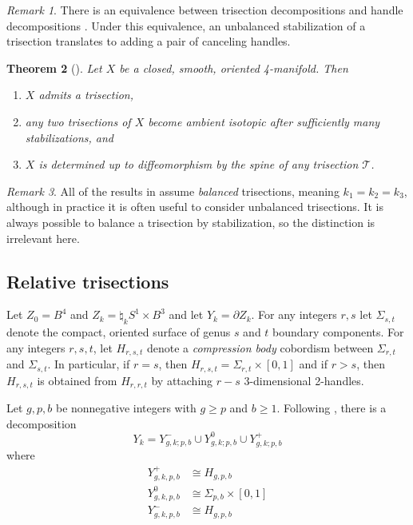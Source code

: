 \documentclass[11pt]{amsart}
\newtheorem{theorem}{Theorem}[section]
\theoremstyle{definition}
\theoremstyle{remark}
\newtheorem{remark}[theorem]{Remark}
\numberwithin{equation}{section}
\newcommand{\cT}{\mathcal{T}}
\newcommand{\del}{\partial}
\begin{document}
\begin{remark}
There is an equivalence between trisection decompositions and handle decompositions \cite[Section 4]{Gay-Kirby}.  Under this equivalence, an unbalanced stabilization of a trisection translates to adding a pair of canceling handles.
\end{remark}

\begin{theorem}[\cite{Gay-Kirby}] Let $X$ be a closed, smooth, oriented 4-manifold.  Then
\begin{enumerate}
\item $X$ admits a trisection,
\item any two trisections of $X$ become ambient isotopic after sufficiently many stabilizations, and
\item $X$ is determined up to diffeomorphism by the spine of any trisection $\cT$.
\end{enumerate}
\end{theorem}

\begin{remark}
All of the results in \cite{Gay-Kirby} assume {\it balanced} trisections, meaning $k_1 = k_2 = k_3$, although in practice it is often useful to consider unbalanced trisections.  It is always possible to balance a trisection by stabilization, so the distinction is irrelevant here.
\end{remark}


\subsection{Relative trisections}

Let $Z_0 = B^4$ and $Z_k = \natural_k S^1 \times B^3$ and let $Y_k = \del Z_k$.  For any integers $r,s$ let $\Sigma_{s,t}$ denote the compact, oriented surface of genus $s$ and $t$ boundary components.  For any integers $r,s,t$, let $H_{r,s,t}$ denote a {\it compression body} cobordism between $\Sigma_{r,t}$ and $\Sigma_{s,t}$.  In particular, if $r = s$, then $H_{r,s,t} = \Sigma_{r,t} \times [0,1]$ and if $r > s$, then $H_{r,s,t}$ is obtained from $H_{r,r,t}$ by attaching $r - s$ 3-dimensional 2-handles.  

Let $g,p,b$ be nonnegative integers with $g \geq p$ and $b \geq 1$.  Following \cite{Gay-Kirby,Relative-Tri}, there is a decomposition
\[Y_k = Y^-_{g,k;p,b} \cup Y^0_{g,k;p,b} \cup Y^+_{g,k;p,b}\]
where
\begin{align*}
Y^+_{g,k,p,b} & \cong H_{g,p,b} \\
Y^0_{g,k,p,b} & \cong \Sigma_{p,b} \times [0,1] \\
Y^-_{g,k,p,b} & \cong H_{g,p,b}
\end{align*}
\end{document}
